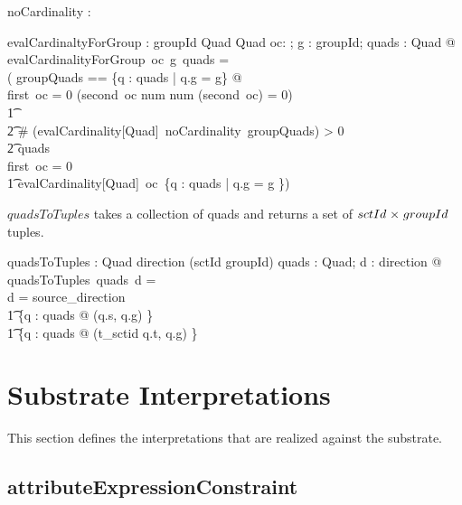 \documentclass{article}
\begin{document}
\begin{axdef}
noCardinality : \optional[cardinality]
\end{axdef}

\begin{gendef}
   evalCardinaltyForGroup : \optional[cardinality]  \pfun groupId \pfun \power Quad \pfun \power Quad 
\where
   \forall  oc: \optional[cardinality];  g : groupId;  quads : \power Quad @
   evalCardinalityForGroup~oc~g~quads = \\
   ( \LET groupQuads == \{q : quads | q.g = g\} @ \\
   \IF first~oc = 0 \land (second~oc \in \ran num \land num \inv (second~oc) = 0) \\
\t1   \THEN  \\
\t2 \IF \# (evalCardinality[Quad]~noCardinality~groupQuads) > 0 \\
\t2 \THEN quads \ELSE \emptyset \\
     \ELSE \IF first~oc = 0 \\
\t1 \THEN evalCardinality[Quad]~oc~\{q : quads | q.g = g \})
\end{gendef}

$quadsToTuples$ takes a collection of quads and returns a set of $sctId \mathrel{\times} groupId$ tuples.
\begin{gendef}
   quadsToTuples : \power Quad \pfun direction \pfun \power (sctId \cross groupId) 
\where
   \forall quads : \power Quad; d : direction @
   quadsToTuples~quads~d = \\
   \IF d = source\_direction \\
\t1 \THEN \{q : quads @ (q.s, q.g) \} \\
\t1 \ELSE \{q : quads @ (t\_sctid \inv q.t, q.g) \}
\end{gendef}




\section{Substrate Interpretations}
\label{sect:substrate}
This section defines the interpretations that are realized against the substrate. 

\subsection{attributeExpressionConstraint}
\end{document}
